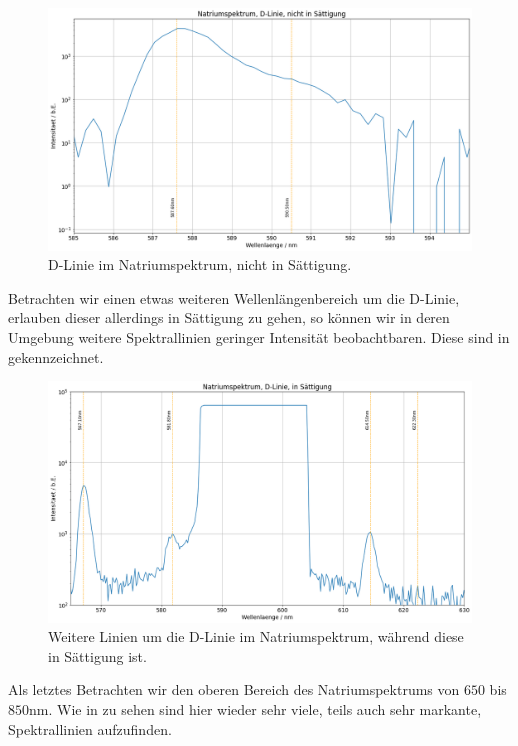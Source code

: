 \begin{figure}[H]
  \centering
  \includegraphics[width=.9\textwidth]{files/plots/na_spek_dlinie_nichtsaett.png}
  \caption{D-Linie im Natriumspektrum, nicht in Sättigung.}
  \label{fig:na_spek_dlinie_nichtsaett}
\end{figure}

Betrachten wir einen etwas weiteren Wellenlängenbereich um die D-Linie, erlauben dieser allerdings in Sättigung zu gehen, so können wir in deren Umgebung weitere Spektrallinien geringer Intensität beobachtbaren. Diese sind in  gekennzeichnet.

\begin{figure}[H]
  \centering
  \includegraphics[width=.9\textwidth]{files/plots/na_spek_dlinie_saett.png}
  \caption{Weitere Linien um die D-Linie im Natriumspektrum, während diese in Sättigung ist.}
  \label{fig:na_spek_dlinie_saett}
\end{figure}

Als letztes Betrachten wir den oberen Bereich des Natriumspektrums von $650$ bis $850\si{\nano\meter}$. Wie in  zu sehen sind hier wieder sehr viele, teils auch sehr markante, Spektrallinien aufzufinden. 


